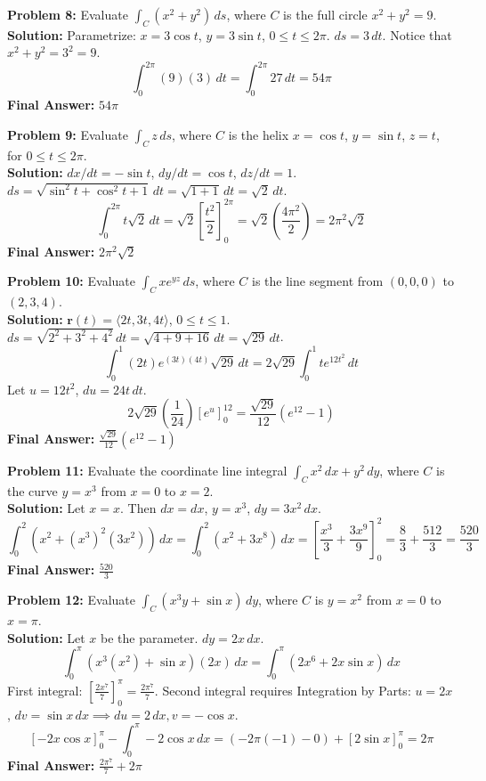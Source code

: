 \documentclass[11pt]{article}
\begin{document}
\textbf{Problem 8:} Evaluate $\int_C (x^2 + y^2) \,ds$, where $C$ is the full circle $x^2 + y^2 = 9$.
\\
\textbf{Solution:} Parametrize: $x = 3\cos t$, $y = 3\sin t$, $0 \le t \le 2\pi$.
$ds = 3 \,dt$. Notice that $x^2 + y^2 = 3^2 = 9$.
$$ \int_0^{2\pi} (9)(3) \,dt = \int_0^{2\pi} 27 \,dt = 54\pi $$
\textbf{Final Answer:} $54\pi$
\vspace{0.5cm}

\textbf{Problem 9:} Evaluate $\int_C z \,ds$, where $C$ is the helix $x = \cos t$, $y = \sin t$, $z = t$, for $0 \le t \le 2\pi$.
\\
\textbf{Solution:} $dx/dt = -\sin t$, $dy/dt = \cos t$, $dz/dt = 1$.
$ds = \sqrt{\sin^2 t + \cos^2 t + 1} \,dt = \sqrt{1 + 1} \,dt = \sqrt{2} \,dt$.
$$ \int_0^{2\pi} t\sqrt{2} \,dt = \sqrt{2} \left[ \frac{t^2}{2} \right]_0^{2\pi} = \sqrt{2} \left( \frac{4\pi^2}{2} \right) = 2\pi^2\sqrt{2} $$
\textbf{Final Answer:} $2\pi^2\sqrt{2}$
\vspace{0.5cm}

\textbf{Problem 10:} Evaluate $\int_C xe^{yz} \,ds$, where $C$ is the line segment from $(0,0,0)$ to $(2,3,4)$.
\\
\textbf{Solution:} $\mathbf{r}(t) = \langle 2t, 3t, 4t \rangle$, $0 \le t \le 1$.
$ds = \sqrt{2^2 + 3^2 + 4^2} \,dt = \sqrt{4 + 9 + 16} \,dt = \sqrt{29} \,dt$.
$$ \int_0^1 (2t)e^{(3t)(4t)}\sqrt{29} \,dt = 2\sqrt{29} \int_0^1 t e^{12t^2} \,dt $$
Let $u = 12t^2$, $du = 24t \,dt$.
$$ 2\sqrt{29} \left( \frac{1}{24} \right) \left[ e^u \right]_0^{12} = \frac{\sqrt{29}}{12}(e^{12} - 1) $$
\textbf{Final Answer:} $\frac{\sqrt{29}}{12}(e^{12} - 1)$
\vspace{0.5cm}

\textbf{Problem 11:} Evaluate the coordinate line integral $\int_C x^2 \,dx + y^2 \,dy$, where $C$ is the curve $y = x^3$ from $x=0$ to $x=2$.
\\
\textbf{Solution:} Let $x=x$. Then $dx = dx$, $y = x^3$, $dy = 3x^2 \,dx$.
$$ \int_0^2 (x^2 + (x^3)^2(3x^2)) \,dx = \int_0^2 (x^2 + 3x^8) \,dx = \left[ \frac{x^3}{3} + \frac{3x^9}{9} \right]_0^2 = \frac{8}{3} + \frac{512}{3} = \frac{520}{3} $$
\textbf{Final Answer:} $\frac{520}{3}$
\vspace{0.5cm}

\textbf{Problem 12:} Evaluate $\int_C (x^3y + \sin x) \,dy$, where $C$ is $y = x^2$ from $x=0$ to $x=\pi$.
\\
\textbf{Solution:} Let $x$ be the parameter. $dy = 2x \,dx$.
$$ \int_0^\pi (x^3(x^2) + \sin x)(2x) \,dx = \int_0^\pi (2x^6 + 2x\sin x) \,dx $$
First integral: $\left[ \frac{2x^7}{7} \right]_0^\pi = \frac{2\pi^7}{7}$.
Second integral requires Integration by Parts: $u=2x$, $dv=\sin x \,dx \implies du=2 \,dx, v=-\cos x$.
$$ [-2x\cos x]_0^\pi - \int_0^\pi -2\cos x \,dx = (-2\pi(-1) - 0) + [2\sin x]_0^\pi = 2\pi $$
\textbf{Final Answer:} $\frac{2\pi^7}{7} + 2\pi$
\vspace{0.5cm}
\end{document}

